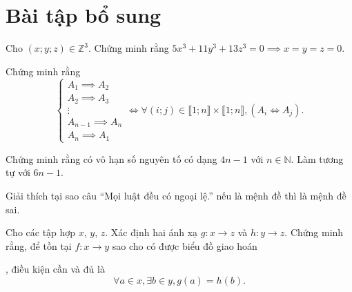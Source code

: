 \chapter*{Bài tập bổ sung}

\exercise Cho $(x; y; z) \in \mathbb{Z}^3$. Chứng minh rằng $5x^3 + 11y^3 + 13z^3 = 0 \implies x = y = z = 0$.

\exercise Chứng minh rằng \begin{equation*}
   \begin{cases}
      A_1 \implies A_2 \\
      A_2 \implies A_3 \\
      \vdots \\
      A_{n-1} \implies A_n \\
      A_n \implies A_1
   \end{cases} \iff \forall (i; j) \in \llbracket 1; n \rrbracket \times \llbracket 1; n \rrbracket, (A_i \iff A_j).
\end{equation*}

\exercise Chứng minh rằng có vô hạn số nguyên tố có dạng $4n - 1$ với $n \in \mathbb{N}$. Làm tương tự với $6n - 1$.

\exercise Giải thích tại sao  câu ``Mọi luật đều có ngoại lệ.'' nếu là mệnh đề thì là mệnh đề sai.

\exercise Cho các tập hợp $x$, $y$, $z$. Xác định hai ánh xạ $g: x \to z$ và $h: y \to z$. Chứng minh rằng, để tồn tại $f:x \to y$ sao cho có được biểu đồ giao hoán
, điều kiện cần và đủ là \begin{equation*}
   \forall a \in x, \exists b \in y, g(a) = h(b).
\end{equation*}



